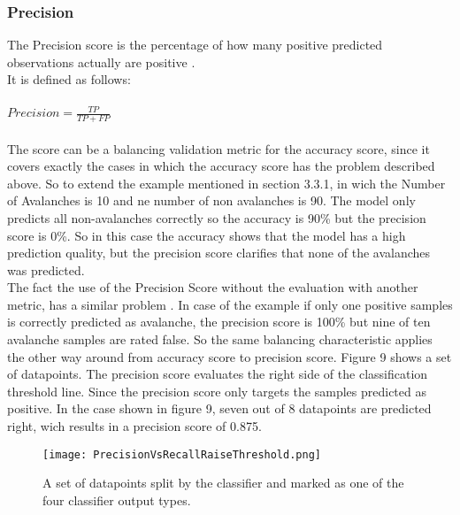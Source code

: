 \documentclass[../masterarbeit.tex]{subfiles}
\begin{document}
\subsubsection{Precision}
The Precision score is the percentage of how many positive predicted observations actually are positive \textcite[]{Kartik_evaluation:2022}.\\
It is defined as follows:
\\~\\
\(Precision = \frac{TP}{TP + FP} \) \hfill \textcite[]{Kartik_evaluation:2022} \\~\\
The score can be a balancing validation metric for the accuracy score, since it covers exactly the cases in which the accuracy score has the problem described above. So to extend the example mentioned in section 3.3.1, in wich the Number of Avalanches is 10 and ne number of non avalanches is 90. The model only predicts all non-avalanches correctly so the accuracy is 90\% but the precision score is 0\%. So in this case the accuracy shows that the model has a high prediction quality, but the precision score clarifies that none of the avalanches was predicted.\\
The fact the use of the Precision Score without the evaluation with another metric, has a similar problem \autocite[]{Google_Precision_Recall:2022}. In case of the example if only one positive samples is correctly predicted as avalanche, the precision score is 100\% but nine of ten avalanche samples are rated false. So the same balancing characteristic applies the other way around from accuracy score to precision score. Figure 9 shows a set of datapoints. The precision score evaluates the right side of the classification threshold line. Since the precision score only targets the samples predicted as positive. In the case shown in figure 9, seven out of 8 datapoints are predicted right, wich results in a precision score of 0.875.



\begin{figure}[h]
    \centering
    \texttt{[image: PrecisionVsRecallRaiseThreshold.png]}
    \caption{A set of datapoints split by the classifier and marked as one of the four classifier output types.}
\end{figure} 
\end{document}

